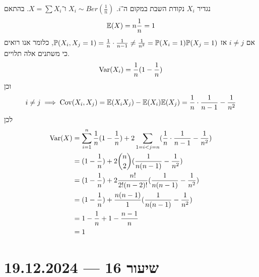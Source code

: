 \begin{solution}
	נגדיר $X_i$ נקודת השבת במקום ה־$i$.
	$X_i \sim Ber(\frac{1}{n})$ ו־$X = \sum X_i$.
	בהתאם
	\[
		\mathbb{E}(X) = n \frac{1}{n} = 1
	\]
	אם $i \ne j$ אז $\mathbb{P}(X_i, X_j = 1) = \frac{1}{n} \cdot \frac{1}{n - 1} \ne \frac{1}{n^2} = \mathbb{P}(X_i = 1) \mathbb{P}(X_j = 1)$, כלומר אנו רואים כי משתנים אלה תלויים.
	\[
		\operatorname{Var}(X_i) = \frac{1}{n} (1 - \frac{1}{n})
	\]
	וכן
	\[
		i \ne j
		\implies \operatorname{Cov}(X_i, X_j)
		= \mathbb{E}(X_i X_j) - \mathbb{E}(X_i) \mathbb{E}(X_j)
		= \frac{1}{n} \cdot \frac{1}{n - 1} - \frac{1}{n^2}
	\]
	לכן
	\begin{align*}
		\operatorname{Var}(X)
		& = \sum_{i = 1}^{n} \frac{1}{n}(1 - \frac{1}{n}) + 2 \sum_{1 = i < j = n} (\frac{1}{n} \cdot \frac{1}{n - 1} - \frac{1}{n^2}) \\
		& = (1 - \frac{1}{n}) + 2 \binom{n}{2} (\frac{1}{n(n - 1)} - \frac{1}{n^2}) \\
		& = (1 - \frac{1}{n}) + 2 \frac{n!}{2! (n - 2)!} (\frac{1}{n(n - 1)} - \frac{1}{n^2}) \\
		& = (1 - \frac{1}{n}) + \frac{n(n - 1)}{1} (\frac{1}{n(n - 1)} - \frac{1}{n^2}) \\
		& = 1 - \frac{1}{n} + 1 - \frac{n - 1}{n} \\
		& = 1
	\end{align*}
\end{solution}

\section{שיעור 16 --- 19.12.2024}

